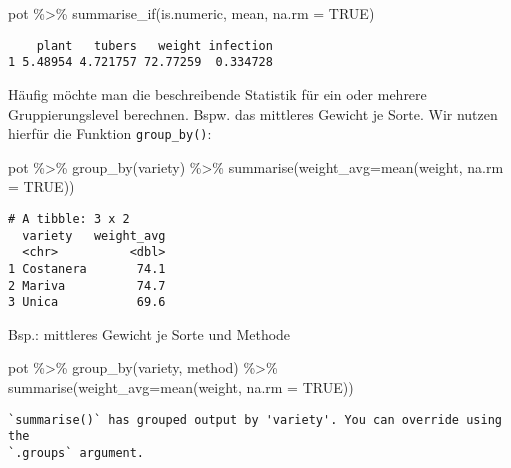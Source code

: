 \documentclass[
  letterpaper,
  DIV=11,
  numbers=noendperiod]{scrartcl}
\newenvironment{Shaded}{\begin{snugshade}}{\end{snugshade}}
\newcommand{\AttributeTok}[1]{\textcolor[rgb]{0.40,0.45,0.13}{#1}}
\newcommand{\ConstantTok}[1]{\textcolor[rgb]{0.56,0.35,0.01}{#1}}
\newcommand{\FunctionTok}[1]{\textcolor[rgb]{0.28,0.35,0.67}{#1}}
\newcommand{\NormalTok}[1]{\textcolor[rgb]{0.00,0.23,0.31}{#1}}
\newcommand{\SpecialCharTok}[1]{\textcolor[rgb]{0.37,0.37,0.37}{#1}}
\begin{document}
\begin{Shaded}
\begin{Highlighting}[]
\NormalTok{pot }\SpecialCharTok{\%\textgreater{}\%}
  \FunctionTok{summarise\_if}\NormalTok{(is.numeric, mean, }\AttributeTok{na.rm =} \ConstantTok{TRUE}\NormalTok{)}
\end{Highlighting}
\end{Shaded}

\begin{verbatim}
    plant   tubers   weight infection
1 5.48954 4.721757 72.77259  0.334728
\end{verbatim}

Häufig möchte man die beschreibende Statistik für ein oder mehrere
Gruppierungslevel berechnen. Bspw. das mittleres Gewicht je Sorte. Wir
nutzen hierfür die Funktion \texttt{group\_by()}:

\begin{Shaded}
\begin{Highlighting}[]
\NormalTok{pot }\SpecialCharTok{\%\textgreater{}\%} \FunctionTok{group\_by}\NormalTok{(variety) }\SpecialCharTok{\%\textgreater{}\%} 
  \FunctionTok{summarise}\NormalTok{(}\AttributeTok{weight\_avg=}\FunctionTok{mean}\NormalTok{(weight, }\AttributeTok{na.rm =} \ConstantTok{TRUE}\NormalTok{))}
\end{Highlighting}
\end{Shaded}

\begin{verbatim}
# A tibble: 3 x 2
  variety   weight_avg
  <chr>          <dbl>
1 Costanera       74.1
2 Mariva          74.7
3 Unica           69.6
\end{verbatim}

Bsp.: mittleres Gewicht je Sorte und Methode

\begin{Shaded}
\begin{Highlighting}[]
\NormalTok{pot }\SpecialCharTok{\%\textgreater{}\%} \FunctionTok{group\_by}\NormalTok{(variety, method) }\SpecialCharTok{\%\textgreater{}\%} 
  \FunctionTok{summarise}\NormalTok{(}\AttributeTok{weight\_avg=}\FunctionTok{mean}\NormalTok{(weight, }\AttributeTok{na.rm =} \ConstantTok{TRUE}\NormalTok{))}
\end{Highlighting}
\end{Shaded}

\begin{verbatim}
`summarise()` has grouped output by 'variety'. You can override using the
`.groups` argument.
\end{verbatim}
\end{document}
